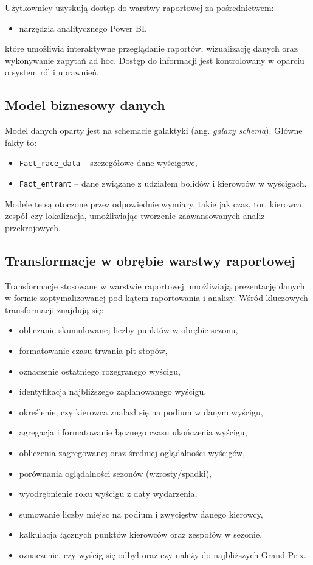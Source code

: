 \documentclass[12pt]{article}
\begin{document}
Użytkownicy uzyskują dostęp do warstwy raportowej za pośrednictwem:
\begin{itemize}
    \item narzędzia analitycznego Power BI,
\end{itemize}
które umożliwia interaktywne przeglądanie raportów, wizualizację danych oraz wykonywanie zapytań ad hoc. Dostęp do informacji jest kontrolowany w oparciu o system ról i uprawnień.

\subsection*{Model biznesowy danych}

Model danych oparty jest na schemacie galaktyki (ang. \textit{galaxy schema}). Główne fakty to:
\begin{itemize}
    \item \texttt{Fact\_race\_data} – szczegółowe dane wyścigowe,
    \item \texttt{Fact\_entrant} – dane związane z udziałem bolidów i kierowców w wyścigach.
\end{itemize}
Modele te są otoczone przez odpowiednie wymiary, takie jak czas, tor, kierowca, zespół czy lokalizacja, umożliwiając tworzenie zaawansowanych analiz przekrojowych.

\subsection*{Transformacje w obrębie warstwy raportowej}

Transformacje stosowane w warstwie raportowej umożliwiają prezentację danych w formie zoptymalizowanej pod kątem raportowania i analizy. Wśród kluczowych transformacji znajdują się:
\begin{itemize}
    \item obliczanie skumulowanej liczby punktów w obrębie sezonu,
    \item formatowanie czasu trwania pit stopów,
    \item oznaczenie ostatniego rozegranego wyścigu,
    \item identyfikacja najbliższego zaplanowanego wyścigu,
    \item określenie, czy kierowca znalazł się na podium w danym wyścigu,
    \item agregacja i formatowanie łącznego czasu ukończenia wyścigu,
    \item obliczenia zagregowanej oraz średniej oglądalności wyścigów,
    \item porównania oglądalności sezonów (wzrosty/spadki),
    \item wyodrębnienie roku wyścigu z daty wydarzenia,
    \item sumowanie liczby miejsc na podium i zwycięstw danego kierowcy,
    \item kalkulacja łącznych punktów kierowców oraz zespołów w sezonie,
    \item oznaczenie, czy wyścig się odbył oraz czy należy do najbliższych Grand Prix.
\end{itemize}
\end{document}
